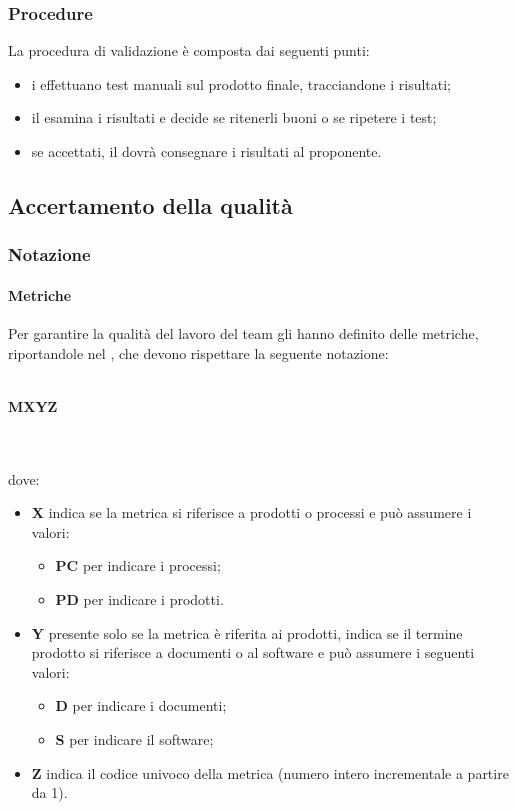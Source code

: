  \subsubsection{Procedure}
 La procedura di validazione è composta dai seguenti punti:
 \begin{itemize}
 	\item i \VERP{} effettuano test manuali sul prodotto finale, tracciandone i risultati;
 	\item il \RESP{} esamina i risultati e decide se ritenerli buoni o se ripetere i test;
 	\item se accettati, il \RESP{} dovrà consegnare i risultati al proponente.
 \end{itemize}
 \newpage

\subsection{Accertamento della qualità}\label{qualita}
\subsubsection{Notazione}
\paragraph{Metriche}
Per garantire la qualità del lavoro del team gli \AMMP{} hanno definito delle metriche, riportandole
nel \PQdoc, che devono rispettare la seguente notazione:\\ \\
\centerline{\textbf{M\textbraceleft{}X\textbraceright{}\textbraceleft{}Y\textbraceright{}\textbraceleft{}Z\textbraceright{}}} \\ \\
dove:
\begin{itemize}
	\item \textbf{X} indica se la metrica si riferisce a prodotti o processi e può assumere
	i valori:
	\begin{itemize}
		\item \textbf{PC} per indicare i processi;
		\item \textbf{PD} per indicare i prodotti.
	\end{itemize}
	\item \textbf{Y} presente solo se la metrica è riferita ai prodotti, indica se il termine prodotto si riferisce a documenti o al software e può assumere i seguenti valori:
	\begin{itemize}
		\item \textbf{D} per indicare i documenti;
		\item \textbf{S} per indicare il software;
	\end{itemize}
	\item \textbf{Z} indica il codice univoco della metrica (numero intero incrementale a partire da 1).
\end{itemize}
